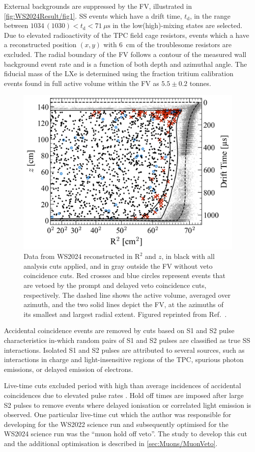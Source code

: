 External backgrounds are suppressed by the FV, illustrated in \autoref{fig:WS2024Result/fig1}. SS events which have a drift time, $t_\text{d}$, in the range between $1034\,(1030)<t_\text{d}<71~\mu\text{s}$ in the low(high)-mixing states are selected. Due to elevated radioactivity of the TPC field cage resistors, events which a have a reconstructed position $(x,y)$ with 6~cm of the troublesome resistors are excluded. The radial boundary of the FV follows a contour of the measured wall background event rate and is a function of both depth and azimuthal angle. The fiducial mass of the LXe is determined using the fraction tritium calibration events found in full active volume within the FV as $5.5\pm0.2$ tonnes.
\begin{figure}[t!]
    \centering
    \includegraphics[width=0.7\linewidth]{figures/WS2024Result/figure1.png}
    \caption{Data from WS2024 reconstructed in $\text{R}^2$ and $z$, in black with all analysis cuts applied, and in gray outside the FV without veto coincidence cuts. Red crosses and blue circles represent events that are vetoed by the prompt and delayed veto coincidence cuts, respectively. The dashed line shows the active volume, averaged over azimuth, and the two solid lines depict the FV, at the azimuths of its smallest and largest radial extent. Figured reprinted from Ref.~\cite{LZCollaboration:2024lux}.}
    \label{fig:WS2024Result/fig1}
\end{figure}
Accidental coincidence events are removed by cuts based on S1 and S2 pulse characteristics in-which random pairs of S1 and S2 pulses are classified as true SS interactions. Isolated S1 and S2 pulses are attributed to several sources, such as interactions in charge and light-insensitive regions of the TPC, spurious photon emissions, or delayed emission of electrons.

Live-time cuts excluded period with high than average incidences of accidental coincidences due to elevated pulse rates \cite{LZCollaboration:2024lux}. Hold off times are imposed after large S2 pulses to remove events where delayed ionisation or correlated light emission is observed. One particular live-time cut which the author was responsible for developing for the WS2022 science run and subsequently optimised for the WS2024 science run was the ``muon hold off veto''. The study to develop this cut and the additional optimisation is described in \autoref{sec:Muons/MuonVeto}.


